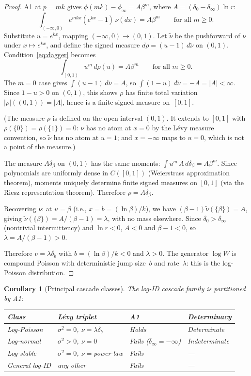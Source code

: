 \documentclass[12pt]{amsart}
\newtheorem{corollary}[theorem]{Corollary}
\theoremstyle{definition}
\theoremstyle{remark}
\begin{document}
\begin{proof}
A1 at $p = mk$ gives $\phi(mk) - \phi_\infty = A\beta^m$, where $A =
(\delta_0 - \delta_\infty)\ln r$:
\begin{equation}\label{eq:dagger}
  \int_{(-\infty,0)} e^{mkx}(e^{kx}-1)\,\nu(dx) = A\beta^m
  \qquad\text{for all } m \geq 0.
\end{equation}
Substitute $u = e^{kx}$, mapping $(-\infty,0) \to (0,1)$.  Let
$\tilde\nu$ be the pushforward of $\nu$ under $x \mapsto e^{kx}$, and
define the signed measure $d\rho = (u-1)\,d\tilde\nu$ on $(0,1)$.
Condition~\eqref{eq:dagger} becomes
\[
  \int_{(0,1)} u^m\,d\rho(u) = A\beta^m
  \qquad\text{for all } m \geq 0.
\]
The $m = 0$ case gives $\int(u-1)\,d\tilde\nu = A$, so $\int(1-u)\,
d\tilde\nu = -A = |A| < \infty$.  Since $1 - u > 0$ on $(0,1)$, this
shows $\rho$ has finite total variation $|\rho|((0,1)) = |A|$, hence
is a finite signed measure on~$[0,1]$.

(The measure $\rho$ is defined on the open interval $(0,1)$.  It
extends to $[0,1]$ with $\rho(\{0\}) = \rho(\{1\}) = 0$: $\nu$ has no
atom at $x = 0$ by the L\'evy measure convention, so $\tilde\nu$ has
no atom at $u = 1$; and $x = -\infty$ maps to $u = 0$, which is not a
point of the measure.)

The measure $A\delta_\beta$ on $(0,1)$ has the same moments: $\int
u^m\,A\,d\delta_\beta = A\beta^m$.  Since polynomials are uniformly
dense in $C([0,1])$ (Weierstrass approximation theorem), moments
uniquely determine finite signed measures on $[0,1]$ (via the Riesz
representation theorem).  Therefore $\rho = A\delta_\beta$.

Recovering $\nu$: at $u = \beta$ (i.e., $x = b = (\ln\beta)/k$), we
have $(\beta - 1)\tilde\nu(\{\beta\}) = A$, giving
$\tilde\nu(\{\beta\}) = A/(\beta-1) = \lambda$, with no mass
elsewhere.  Since $\delta_0 > \delta_\infty$ (nontrivial
intermittency) and $\ln r < 0$, $A < 0$ and $\beta - 1 < 0$, so
$\lambda = A/(\beta-1) > 0$.

Therefore $\nu = \lambda\delta_b$ with $b = (\ln\beta)/k < 0$ and
$\lambda > 0$.  The generator $\log W$ is compound Poisson with
deterministic jump size~$b$ and rate~$\lambda$: this is the
log-Poisson distribution.
\end{proof}

\begin{corollary}[Principal cascade classes]\label{cor:partition}
The log-ID cascade family is partitioned by A1:
\begin{center}\footnotesize
\begin{tabular}{@{}llll@{}}
\toprule
Class & L\'evy triplet & A1 & Determinacy \\
\midrule
Log-Poisson & $\sigma^2=0$, $\nu=\lambda\delta_b$ & Holds
  & Determinate \\
Log-normal & $\sigma^2>0$, $\nu=0$ &
  Fails ($\delta_\infty=-\infty$) & Indeterminate \\
Log-stable & $\sigma^2=0$, $\nu=$power-law &
  Fails & --- \\
General log-ID & any other & Fails & --- \\
\bottomrule
\end{tabular}
\end{center}
\end{corollary}
\end{document}
